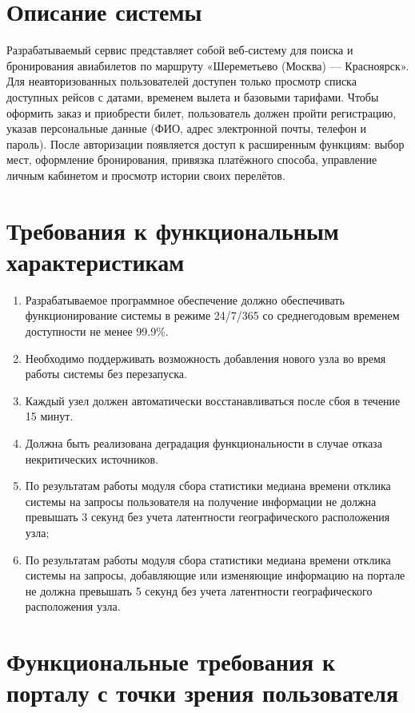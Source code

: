 \section*{Описание системы}

Разрабатываемый сервис представляет собой веб‑систему для поиска и бронирования авиабилетов по маршруту «Шереметьево (Москва) — Красноярск». 
Для неавторизованных пользователей доступен только просмотр списка доступных рейсов с датами, временем вылета и базовыми тарифами. 
Чтобы оформить заказ и приобрести билет, пользователь должен пройти регистрацию, указав персональные данные (ФИО, адрес электронной почты, телефон и пароль). 
После авторизации появляется доступ к расширенным функциям: выбор мест, оформление бронирования, привязка платёжного способа, управление личным кабинетом и просмотр истории своих перелётов.


\section*{Требования к функциональным характеристикам}

\begin{enumerate}
    \item  Разрабатываемое программное обеспечение должно обеспечивать функционирование системы в режиме 24/7/365 со среднегодовым временем доступности не менее 99.9\%.
	\item Необходимо поддерживать возможность добавления нового
	узла во время работы системы без перезапуска.
	\item Каждый узел должен автоматически восстанавливаться после сбоя в течение 15 минут.
    \item Должна быть реализована деградация функциональности в случае отказа некритических источников.
    \item По результатам работы модуля сбора статистики медиана времени отклика системы на запросы пользователя на получение информации не должна превышать 3 секунд без учета латентности географического расположения узла;
	\item По результатам работы модуля сбора статистики медиана времени отклика системы на запросы, добавляющие или изменяющие информацию на портале не должна превышать 5 секунд без учета латентности географического расположения узла.
\end{enumerate}

\section*{Функциональные требования к порталу с точки зрения пользователя}

